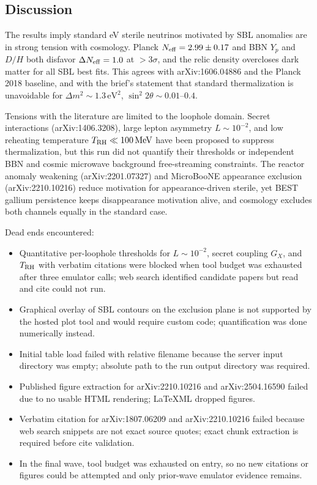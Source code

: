 \documentclass[11pt,a4paper]{article}
\begin{document}
\subsection{Discussion}
The results imply standard eV sterile neutrinos motivated by SBL anomalies are in strong tension with cosmology. Planck $N_{\rm eff} = 2.99 \pm 0.17$ and BBN $Y_p$ and $D/H$ both disfavor $\Delta N_{\rm eff} = 1.0$ at $>3\sigma$, and the relic density overcloses dark matter for all SBL best fits. This agrees with arXiv:1606.04886 and the Planck 2018 baseline, and with the brief's statement that standard thermalization is unavoidable for $\Delta m^2 \sim 1.3\,\mathrm{eV}^2$, $\sin^2 2\theta \sim 0.01$--$0.4$.

Tensions with the literature are limited to the loophole domain. Secret interactions (arXiv:1406.3208), large lepton asymmetry $L \sim 10^{-2}$, and low reheating temperature $T_{\rm RH} \ll 100\,\mathrm{MeV}$ have been proposed to suppress thermalization, but this run did not quantify their thresholds or independent BBN and cosmic microwave background free-streaming constraints. The reactor anomaly weakening (arXiv:2201.07327) and MicroBooNE appearance exclusion (arXiv:2210.10216) reduce motivation for appearance-driven sterile, yet BEST gallium persistence keeps disappearance motivation alive, and cosmology excludes both channels equally in the standard case.

Dead ends encountered:

\begin{itemize}
  \item Quantitative per-loophole thresholds for $L \sim 10^{-2}$, secret coupling $G_X$, and $T_{\rm RH}$ with verbatim citations were blocked when tool budget was exhausted after three emulator calls; web search identified candidate papers but read and cite could not run.
  \item Graphical overlay of SBL contours on the exclusion plane is not supported by the hosted plot tool and would require custom code; quantification was done numerically instead.
  \item Initial table load failed with relative filename because the server input directory was empty; absolute path to the run output directory was required.
  \item Published figure extraction for arXiv:2210.10216 and arXiv:2504.16590 failed due to no usable HTML rendering; LaTeXML dropped figures.
  \item Verbatim citation for arXiv:1807.06209 and arXiv:2210.10216 failed because web search snippets are not exact source quotes; exact chunk extraction is required before cite validation.
  \item In the final wave, tool budget was exhausted on entry, so no new citations or figures could be attempted and only prior-wave emulator evidence remains.
\end{itemize}
\end{document}
